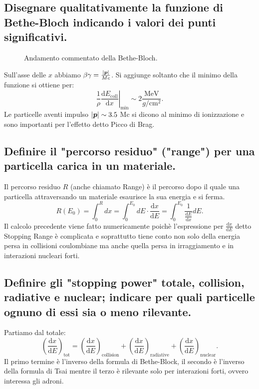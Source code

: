 \subsection[\hspace{1mm} ]{Disegnare qualitativamente la funzione di Bethe-Bloch indicando i valori dei punti significativi.
}\label{sec:4.a.23}
\begin{figure}[H]
    \centering
    \caption{Andamento commentato della Bethe-Bloch.}
    \label{fig:bethe}
\end{figure}
Sull'asse delle $x$ abbiamo $\beta\gamma = \frac{\left| \boldsymbol{p} \right| }{Mc}$.
Si  aggiunge soltanto che il minimo della funzione si ottiene per:
\[
	\frac{1}{\rho}\left.\frac{\mbox{d} E_{\text{coll}} }{\mbox{d} x} \right|_{\text{min}} \sim 2 \frac{\text{MeV}}{g /\text{cm}^2} 
.\] 
Le particelle aventi impulso $\left| \boldsymbol{p} \right| \sim 3.5$ Mc si dicono al minimo di ionizzazione e sono importanti per l'effetto detto Picco di Brag.

\subsection[\hspace{1mm} ]{Definire il "percorso residuo" ("range") per una particella carica in un materiale.
}\label{sec:4.a.24}
Il percorso residuo $R$ (anche chiamato Range) è il percorso dopo il quale una particella attraversando un materiale esaurisce la sua energia e si ferma.\[
	R\left( E_0 \right) = \int_0^{R} dx = \int_0^{E_0} dE \cdot \frac{\mbox{d} x}{\mbox{d} E} =
	\int_0^{E_0}\frac{1}{\frac{\mbox{d} E}{\mbox{d} x} } dE
.\] 
Il calcolo precedente viene fatto numericamente poichè l'espressione per $\frac{\mbox{d} x}{\mbox{d} E}$ detto Stopping Range è complicata e soprattutto tiene conto non solo della energia persa in collisioni coulombiane ma anche quella persa in irraggiamento e in interazioni nucleari forti.
\subsection[\hspace{1mm} ]{Definire gli "stopping power" totale, collision, radiative e nuclear; indicare per quali particelle ognuno di essi sia o meno rilevante.
}\label{sec:4.a.25}
Partiamo dal totale:
\[
	\left( \frac{\mbox{d} x}{\mbox{d} E} \right)_{\text{tot}}= \left( \frac{\mbox{d} x}{\mbox{d} E} \right)_{\text{collision}}+\left( \frac{\mbox{d} x}{\mbox{d} E} \right)_{\text{radiative}}+\left( \frac{\mbox{d} x}{\mbox{d} E} \right)_{\text{nuclear}}
.\] 
Il primo termine è l'inverso della formula di Bethe-Block, il secondo è l'inverso della formula di Tsai mentre il terzo è rilevante solo per interazioni forti, ovvero interessa gli adroni.

